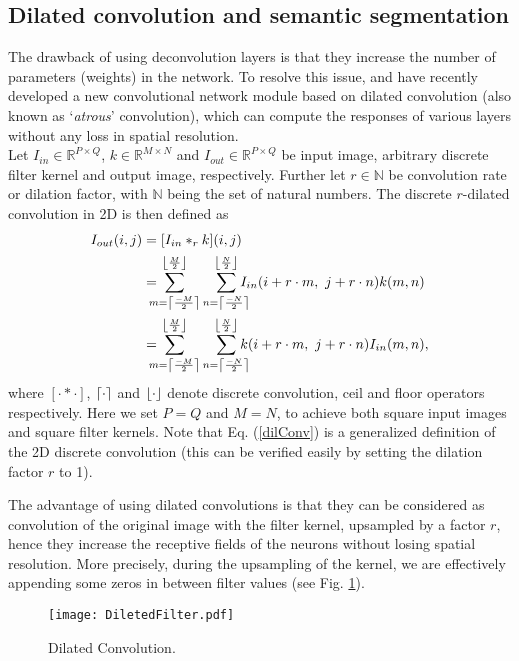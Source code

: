 \documentclass[a4paper]{mva_style}
\DeclarePairedDelimiter\ceil{\lceil}{\rceil}
\DeclarePairedDelimiter\floor{\lfloor}{\rfloor}
\begin{document}
\subsection{Dilated convolution and semantic segmentation}
The drawback of using deconvolution layers is that they increase the number of parameters (weights) in the network. To resolve this issue, \cite{Yu2016multi} and \cite{chen2016deeplab} have recently developed a new convolutional network module based on dilated convolution (also known as `\textit{atrous}' convolution), which can compute the responses of various layers without any loss in spatial resolution.\\
\indent Let $I_{in} \in \mathbb{R}^{P\times Q}$, $k \in \mathbb{R}^{M\times N}$ and $I_{out} \in \mathbb{R}^{P\times Q}$ be input image, arbitrary discrete filter kernel and output image, respectively. Further let $r \in \mathbb{N}$ be convolution rate or dilation factor, with $\mathbb{N}$ being the set of natural numbers. The discrete  $r$-dilated convolution in 2D is then defined as \cite{chen2016deeplab}
\begin{equation} \label{dilConv}
\begin{split}
I_{out}(i, j) & = [I_{in}\ast_r k] (i,j)\\
& =\hspace{-0.3cm} \sum_{m =  \ceil*{\frac{-M}{2}}}^{\floor*{\frac{M}{2}}}\sum_{n =  \ceil*{\frac{-N}{2}}}^{\floor*{\frac{N}{2}}}\hspace{-0.3cm}I_{in}(i + r\cdot m,\ j+r\cdot n)k(m,n)\\
& =\hspace{-0.3cm} \sum_{m =  \ceil*{\frac{-M}{2}}}^{\floor*{\frac{M}{2}}}\sum_{n =  \ceil*{\frac{-N}{2}}}^{\floor*{\frac{N}{2}}}\hspace{-0.3cm}k(i + r\cdot m,\ j+r\cdot n)I_{in}(m,n),\\
\end{split}
\end{equation}
where $[\cdot\ast \cdot]$, $\ceil{\cdot}$ and $\floor{\cdot}$ denote discrete convolution, ceil and floor operators respectively. Here we set $P = Q$ and $M=N$, to achieve both square input images and square filter kernels. Note that Eq. (\ref{dilConv}) is a generalized definition of the 2D discrete convolution (this can be verified easily by setting the dilation factor $r$ to 1). 

The advantage of using dilated convolutions is that they can be considered as convolution of the original image with the filter kernel, upsampled by a factor $r$, hence they increase the receptive fields of the neurons without losing spatial resolution. More precisely, during the upsampling of the kernel, we are effectively appending some zeros in between filter values (see Fig. \ref{fig:DilatedFilter}). %
\begin{figure}[H]
  \begin{minipage}[b]{1\linewidth}
    \centering
     \centerline{\texttt{[image: DiletedFilter.pdf]}}
\end{minipage}
    \caption{Dilated Convolution.}
  \label{fig:DilatedFilter}
\end{figure}
\end{document}
